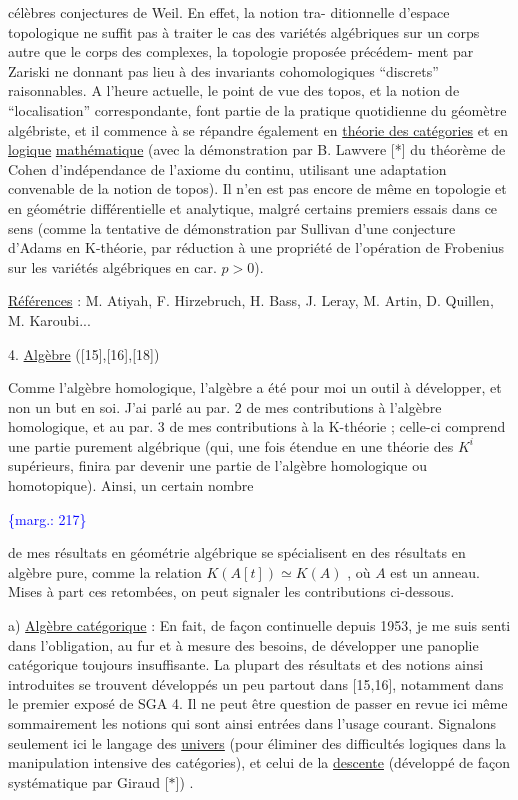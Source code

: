 \documentclass[11pt]{article}
\newcommand{\scanpage}[1]{\par\bigskip\noindent{\small\sffamily[scan #1]}\par}
\newcommand{\mspage}[1]{{\small\sffamily[p.\,#1]}}
\newcommand{\margin}[1]{\textcolor{blue}{\{\textsf{marg.:} #1\}}}
\newcommand{\uline}[1]{\underline{#1}}
\begin{document}
célèbres conjectures de Weil. En effet, la notion tra-%
ditionnelle d'espace topologique ne suffit pas à traiter
le cas des variétés algébriques sur un corps autre que
le corps des complexes, la topologie proposée précédem-%
ment par Zariski ne donnant pas lieu à des invariants
cohomologiques ``discrets'' raisonnables. A l'heure actuelle,
le point de vue des topos, et la notion de ``localisation''
correspondante, font partie de la pratique quotidienne
du géomètre algébriste, et il commence à se répandre
également en \uline{théorie des catégories} et en \uline{logique}
\uline{mathématique} (avec la démonstration par B. Lawvere [*]
du théorème de Cohen d'indépendance de l'axiome du
continu, utilisant une adaptation convenable de la notion
de topos). Il n'en est pas encore de même en topologie
et en géométrie différentielle et analytique, malgré
certains premiers essais dans ce sens (comme la tentative
de démonstration par Sullivan d'une conjecture d'Adams
en K-théorie, par réduction à une propriété de l'opération
de Frobenius sur les variétés algébriques en car. $p > 0$).

\uline{Références} : M. Atiyah, F. Hirzebruch, H. Bass, J. Leray,
M. Artin, D. Quillen, M. Karoubi...

4. \uline{Algèbre} ([15],[16],[18])

Comme l'algèbre homologique, l'algèbre a été
pour moi un outil à développer, et non un but en soi.
J'ai parlé au par. 2 de mes contributions à l'algèbre
homologique, et au par. 3 de mes contributions à la
K-théorie ; celle-ci comprend une partie purement
algébrique (qui, une fois étendue en une théorie des $K^{i}$
supérieurs, finira par devenir une partie de l'algèbre
homologique ou homotopique). Ainsi, un certain nombre

\margin{217}

\clearpage
\scanpage{119/218}
\mspage{. 5 .}

de mes résultats en géométrie algébrique se spécialisent
en des résultats en algèbre pure, comme la relation
$K(A[t]) \simeq K(A)$ , où $A$ est un anneau. Mises à part
ces retombées, on peut signaler les contributions ci-dessous.

a) \uline{Algèbre catégorique} : En fait, de façon continuelle
depuis 1953, je me suis senti dans l'obligation, au
fur et à mesure des besoins, de développer une panoplie
catégorique toujours insuffisante. La plupart des
résultats et des notions ainsi introduites se trouvent
développés un peu partout dans [15,16], notamment dans
le premier exposé de SGA 4. Il ne peut être question
de passer en revue ici même sommairement les notions
qui sont ainsi entrées dans l'usage courant. Signalons
seulement ici le langage des \uline{univers} (pour éliminer
des difficultés logiques dans la manipulation intensive
des catégories), et celui de la \uline{descente} (développé de
façon systématique par Giraud [$*$]) .
\end{document}
